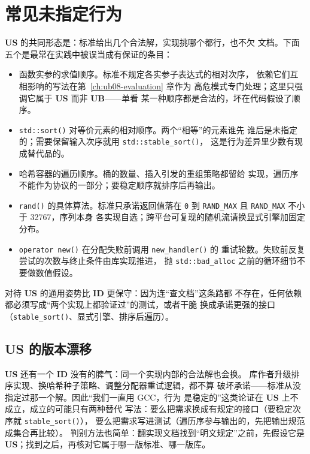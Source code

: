\documentclass[12pt,a4paper,fontset=fandol]{ctexbook}
\newcommand{\Fn}[1]{\texttt{#1()}}
\newcommand{\Tp}[1]{\texttt{#1}}
\newcommand{\UB}{\textbf{\textsf{UB}}}
\newcommand{\IDB}{\textbf{\textsf{ID}}}
\newcommand{\USB}{\textbf{\textsf{US}}}
\newcommand{\Feat}[1]{\texttt{#1}}
\begin{document}
\section{常见未指定行为}\label{sec:ub13-usb-catalogue}

\USB{} 的共同形态是：标准给出几个合法解，实现挑哪个都行，也不欠
文档。下面五个是最常在实践中被误当成有保证的条目：

\begin{itemize}
\item 函数实参的求值顺序。标准不规定各实参子表达式的相对次序，
    依赖它们互相影响的写法在第~\ref{ch:ub08-evaluation} 章作为
    高危模式专门处理；这里只强调它属于 \USB{} 而非 \UB{}——单看
    某一种顺序都是合法的，坏在代码假设了顺序。
\item \Fn{std::sort} 对等价元素的相对顺序。两个“相等”的元素谁先
    谁后是未指定的；需要保留输入次序就用 \Fn{std::stable\_sort}，
    这是行为差异里少数有现成替代品的。
\item 哈希容器的遍历顺序。桶的数量、插入引发的重组策略都留给
    实现，遍历序不能作为协议的一部分；要稳定顺序就排序后再输出。
\item \Fn{rand} 的具体算法。标准只承诺返回值落在 \Tp{0} 到
    \Feat{RAND\_MAX} 且 \Feat{RAND\_MAX} 不小于 32767，序列本身
    各实现自选；跨平台可复现的随机流请换显式引擎加固定分布。
\item \Fn{operator new} 在分配失败前调用 \Fn{new\_handler} 的
    重试轮数。失败前反复尝试的次数与终止条件由库实现推进，
    抛 \Tp{std::bad\_alloc} 之前的循环细节不要做数值假设。
\end{itemize}

对待 \USB{} 的通用姿势比 \IDB{} 更保守：因为连“查文档”这条路都
不存在，任何依赖都必须写成“两个实现上都验证过”的测试，或者干脆
换成承诺更强的接口（\Fn{stable\_sort}、显式引擎、排序后遍历）。

\subsection{\USB{} 的版本漂移}\label{sec:ub13-usb-drift}

\USB{} 还有一个 \IDB{} 没有的脾气：同一个实现内部的合法解也会换。
库作者升级排序实现、换哈希种子策略、调整分配器重试逻辑，都不算
破坏承诺——标准从没指定过那一个解。因此“我们一直用 GCC，行为
是稳定的”这类论证在 \USB{} 上不成立，成立的可能只有两种替代
写法：要么把需求换成有规定的接口（要稳定次序就 \Fn{stable\_sort}），
要么把需求写进测试（遍历序参与输出的，先把输出规范成集合再比较）。
判别方法也简单：翻实现文档找到“明文规定”之前，先假设它是
\USB{}；找到之后，再核对它属于哪一版标准、哪一版库。
\end{document}
